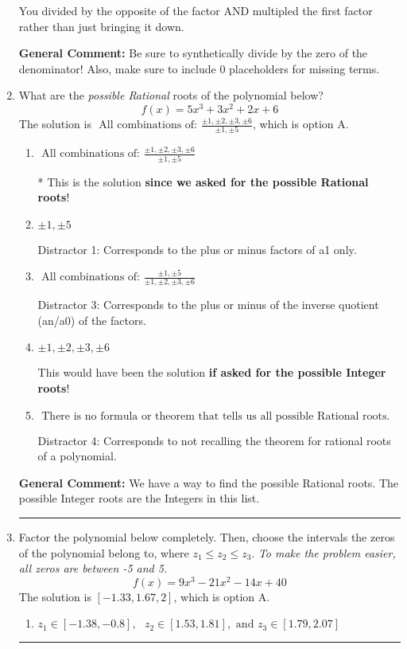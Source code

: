 \documentclass{extbook}[14pt]
\newcommand{\litem}[1]{\item #1

\rule{\textwidth}{0.4pt}}
\begin{document}
\begin{enumerate}
{\begin{enumerate}[label=\Alph*.]
 You divided by the opposite of the factor AND multipled the first factor rather than just bringing it down.
\end{enumerate}

\textbf{General Comment:} Be sure to synthetically divide by the zero of the denominator! Also, make sure to include 0 placeholders for missing terms.
}
\litem{
What are the \textit{possible Rational} roots of the polynomial below?
\[ f(x) = 5x^{3} +3 x^{2} +2 x + 6 \]The solution is \( \text{ All combinations of: }\frac{\pm 1,\pm 2,\pm 3,\pm 6}{\pm 1,\pm 5} \), which is option A.\begin{enumerate}[label=\Alph*.]
\item \( \text{ All combinations of: }\frac{\pm 1,\pm 2,\pm 3,\pm 6}{\pm 1,\pm 5} \)

* This is the solution \textbf{since we asked for the possible Rational roots}!
\item \( \pm 1,\pm 5 \)

 Distractor 1: Corresponds to the plus or minus factors of a1 only.
\item \( \text{ All combinations of: }\frac{\pm 1,\pm 5}{\pm 1,\pm 2,\pm 3,\pm 6} \)

 Distractor 3: Corresponds to the plus or minus of the inverse quotient (an/a0) of the factors. 
\item \( \pm 1,\pm 2,\pm 3,\pm 6 \)

This would have been the solution \textbf{if asked for the possible Integer roots}!
\item \( \text{ There is no formula or theorem that tells us all possible Rational roots.} \)

 Distractor 4: Corresponds to not recalling the theorem for rational roots of a polynomial.
\end{enumerate}

\textbf{General Comment:} We have a way to find the possible Rational roots. The possible Integer roots are the Integers in this list.
}
\litem{
Factor the polynomial below completely. Then, choose the intervals the zeros of the polynomial belong to, where $z_1 \leq z_2 \leq z_3$. \textit{To make the problem easier, all zeros are between -5 and 5.}
\[ f(x) = 9x^{3} -21 x^{2} -14 x + 40 \]The solution is \( [-1.33, 1.67, 2] \), which is option A.\begin{enumerate}[label=\Alph*.]
\item \( z_1 \in [-1.38, -0.8], \text{   }  z_2 \in [1.53, 1.81], \text{   and   } z_3 \in [1.79, 2.07] \)


\end{enumerate}}
\end{enumerate}
\end{document}
